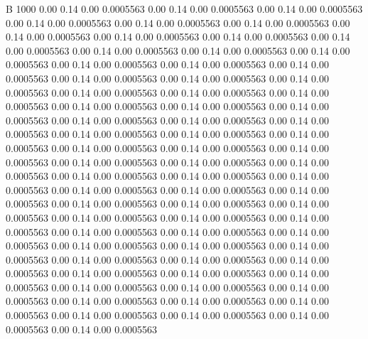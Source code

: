 


B 1000
   0.00    0.14    0.00   0.0005563
   0.00    0.14    0.00   0.0005563
   0.00    0.14    0.00   0.0005563
   0.00    0.14    0.00   0.0005563
   0.00    0.14    0.00   0.0005563
   0.00    0.14    0.00   0.0005563
   0.00    0.14    0.00   0.0005563
   0.00    0.14    0.00   0.0005563
   0.00    0.14    0.00   0.0005563
   0.00    0.14    0.00   0.0005563
   0.00    0.14    0.00   0.0005563
   0.00    0.14    0.00   0.0005563
   0.00    0.14    0.00   0.0005563
   0.00    0.14    0.00   0.0005563
   0.00    0.14    0.00   0.0005563
   0.00    0.14    0.00   0.0005563
   0.00    0.14    0.00   0.0005563
   0.00    0.14    0.00   0.0005563
   0.00    0.14    0.00   0.0005563
   0.00    0.14    0.00   0.0005563
   0.00    0.14    0.00   0.0005563
   0.00    0.14    0.00   0.0005563
   0.00    0.14    0.00   0.0005563
   0.00    0.14    0.00   0.0005563
   0.00    0.14    0.00   0.0005563
   0.00    0.14    0.00   0.0005563
   0.00    0.14    0.00   0.0005563
   0.00    0.14    0.00   0.0005563
   0.00    0.14    0.00   0.0005563
   0.00    0.14    0.00   0.0005563
   0.00    0.14    0.00   0.0005563
   0.00    0.14    0.00   0.0005563
   0.00    0.14    0.00   0.0005563
   0.00    0.14    0.00   0.0005563
   0.00    0.14    0.00   0.0005563
   0.00    0.14    0.00   0.0005563
   0.00    0.14    0.00   0.0005563
   0.00    0.14    0.00   0.0005563
   0.00    0.14    0.00   0.0005563
   0.00    0.14    0.00   0.0005563
   0.00    0.14    0.00   0.0005563
   0.00    0.14    0.00   0.0005563
   0.00    0.14    0.00   0.0005563
   0.00    0.14    0.00   0.0005563
   0.00    0.14    0.00   0.0005563
   0.00    0.14    0.00   0.0005563
   0.00    0.14    0.00   0.0005563
   0.00    0.14    0.00   0.0005563
   0.00    0.14    0.00   0.0005563
   0.00    0.14    0.00   0.0005563
   0.00    0.14    0.00   0.0005563
   0.00    0.14    0.00   0.0005563
   0.00    0.14    0.00   0.0005563
   0.00    0.14    0.00   0.0005563
   0.00    0.14    0.00   0.0005563
   0.00    0.14    0.00   0.0005563
   0.00    0.14    0.00   0.0005563
   0.00    0.14    0.00   0.0005563
   0.00    0.14    0.00   0.0005563
   0.00    0.14    0.00   0.0005563
   0.00    0.14    0.00   0.0005563
   0.00    0.14    0.00   0.0005563
   0.00    0.14    0.00   0.0005563
   0.00    0.14    0.00   0.0005563
   0.00    0.14    0.00   0.0005563
   0.00    0.14    0.00   0.0005563
   0.00    0.14    0.00   0.0005563
   0.00    0.14    0.00   0.0005563
   0.00    0.14    0.00   0.0005563
   0.00    0.14    0.00   0.0005563
   0.00    0.14    0.00   0.0005563
